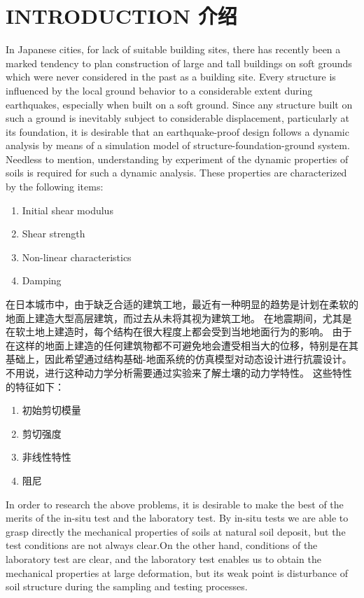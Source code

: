 \section{INTRODUCTION 介绍}

\begin{paracol}{2}

    In Japanese cities, for lack of suitable building sites, there has recently been a marked tendency to plan construction of large and tall buildings on soft grounds which were never considered in the past as a building site. Every structure is influenced by the local ground behavior to a considerable extent during earthquakes, especially when built on a soft ground. Since any structure built on such a ground is inevitably subject to considerable displacement, particularly at its foundation, it is desirable that an earthquake-proof design follows a dynamic analysis by means of a simulation model of structure-foundation-ground system. Needless to mention, understanding by experiment of the dynamic properties of soils is required for such a dynamic analysis. These properties are characterized by the following items:
    \begin{enumerate}
        \item Initial shear modulus
        \item Shear strength
        \item Non-linear characteristics
        \item Damping
    \end{enumerate}

    \switchcolumn

    在日本城市中，由于缺乏合适的建筑工地，最近有一种明显的趋势是计划在柔软的地面上建造大型高层建筑，而过去从未将其视为建筑工地。 在地震期间，尤其是在软土地上建造时，每个结构在很大程度上都会受到当地地面行为的影响。 由于在这样的地面上建造的任何建筑物都不可避免地会遭受相当大的位移，特别是在其基础上，因此希望通过结构基础-地面系统的仿真模型对动态设计进行抗震设计。 不用说，进行这种动力学分析需要通过实验来了解土壤的动力学特性。 这些特性的特征如下：
    \begin{enumerate}
        \item 初始剪切模量
        \item 剪切强度
        \item 非线性特性
        \item 阻尼
    \end{enumerate}

    \switchcolumn*

    In order to research the above problems, it is desirable to make the best of the merits of the in-situ test and the laboratory test. By in-situ tests we are able to grasp directly the mechanical properties of soils at natural soil deposit, but the test conditions are not always clear.On the other hand, conditions of the laboratory test are clear, and the laboratory test enables us to obtain the mechanical properties at large deformation, but its weak point is disturbance of soil structure during the sampling and testing processes.
    

\end{paracol}
